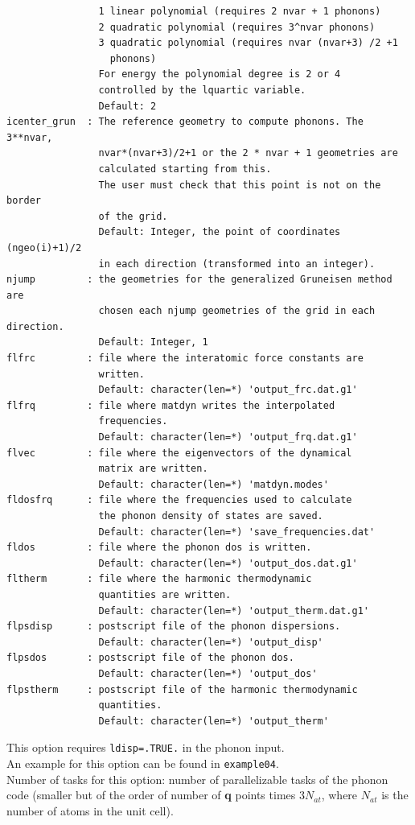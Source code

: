 \documentclass[12pt,a4paper,twoside]{report}
\begin{document}
\begin{verbatim}
                1 linear polynomial (requires 2 nvar + 1 phonons)
                2 quadratic polynomial (requires 3^nvar phonons)
                3 quadratic polynomial (requires nvar (nvar+3) /2 +1
                  phonons)
                For energy the polynomial degree is 2 or 4
                controlled by the lquartic variable.
                Default: 2
icenter_grun  : The reference geometry to compute phonons. The 3**nvar,
                nvar*(nvar+3)/2+1 or the 2 * nvar + 1 geometries are
                calculated starting from this.
                The user must check that this point is not on the border
                of the grid.
                Default: Integer, the point of coordinates (ngeo(i)+1)/2
                in each direction (transformed into an integer).
njump         : the geometries for the generalized Gruneisen method are 
                chosen each njump geometries of the grid in each direction.  
                Default: Integer, 1
flfrc         : file where the interatomic force constants are 
                written.
                Default: character(len=*) 'output_frc.dat.g1'
flfrq         : file where matdyn writes the interpolated 
                frequencies.
                Default: character(len=*) 'output_frq.dat.g1'
flvec         : file where the eigenvectors of the dynamical 
                matrix are written.
                Default: character(len=*) 'matdyn.modes'
fldosfrq      : file where the frequencies used to calculate 
                the phonon density of states are saved.
                Default: character(len=*) 'save_frequencies.dat'
fldos         : file where the phonon dos is written.
                Default: character(len=*) 'output_dos.dat.g1'
fltherm       : file where the harmonic thermodynamic
                quantities are written.
                Default: character(len=*) 'output_therm.dat.g1'
flpsdisp      : postscript file of the phonon dispersions.
                Default: character(len=*) 'output_disp'
flpsdos       : postscript file of the phonon dos.
                Default: character(len=*) 'output_dos'
flpstherm     : postscript file of the harmonic thermodynamic 
                quantities.
                Default: character(len=*) 'output_therm'
\end{verbatim}

This option requires \texttt{ldisp=.TRUE.} in the phonon input. \\
An example for this option can be found in \texttt{example04}. \\
Number of tasks for this option: number of parallelizable tasks of the 
phonon code (smaller but of the order of number of {\bf q} points times 
$3 N_{at}$, where $N_{at}$ is the number of atoms in the unit cell).
\end{document}
